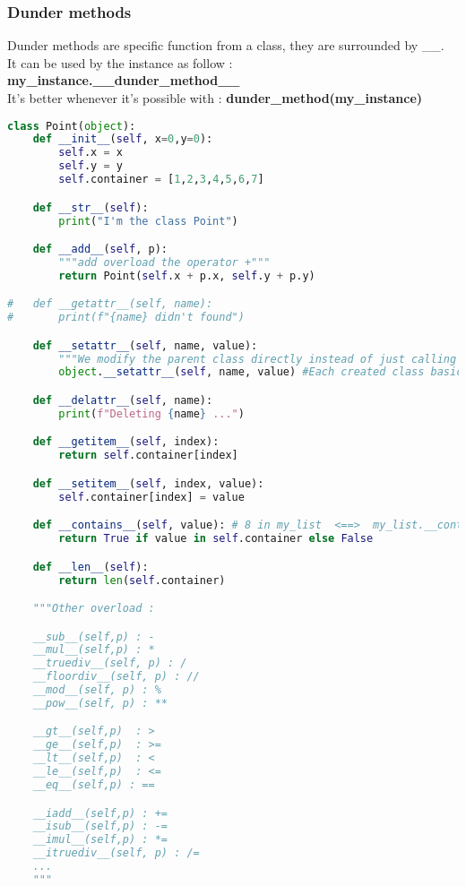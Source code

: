 \documentclass[a4paper, 12pt, titlepage]{scrartcl} %
\begin{document}
\subsubsection{Dunder methods}
Dunder methods are specific function from a class, they are surrounded by \_\_. \\
It can be used by the instance as follow : \textbf{my\_instance.\_\_dunder\_method\_\_} \\
It's better whenever it's possible with : \textbf{dunder\_method(my\_instance)}
\begin{lstlisting}[language=Python]
class Point(object):
	def __init__(self, x=0,y=0):
		self.x = x
		self.y = y
		self.container = [1,2,3,4,5,6,7]

	def __str__(self):
		print("I'm the class Point")

	def __add__(self, p):
		"""add overload the operator +"""
		return Point(self.x + p.x, self.y + p.y)

#	def __getattr__(self, name):
#		print(f"{name} didn't found")

	def __setattr__(self, name, value):
	    """We modify the parent class directly instead of just calling setattr of this class and loop on the same method"""
		object.__setattr__(self, name, value) #Each created class basicly inherits from the class "object"

	def __delattr__(self, name):
		print(f"Deleting {name} ...")

	def __getitem__(self, index):
		return self.container[index]

	def __setitem__(self, index, value):
		self.container[index] = value

	def __contains__(self, value): # 8 in my_list  <==>  my_list.__contains__(8)
		return True if value in self.container else False

	def __len__(self):
		return len(self.container)

	"""Other overload : 

	__sub__(self,p) : -
	__mul__(self,p) : *
	__truediv__(self, p) : /
	__floordiv__(self, p) : //
	__mod__(self, p) : %
	__pow__(self, p) : **

	__gt__(self,p)  : >
	__ge__(self,p) 	: >=
	__lt__(self,p)  : <
	__le__(self,p)  : <=
	__eq__(self,p) : == 

	__iadd__(self,p) : +=
	__isub__(self,p) : -=
	__imul__(self,p) : *=
	__itruediv__(self, p) : /=	
	...
	"""
\end{lstlisting} \vspace{5mm}
\end{document}
